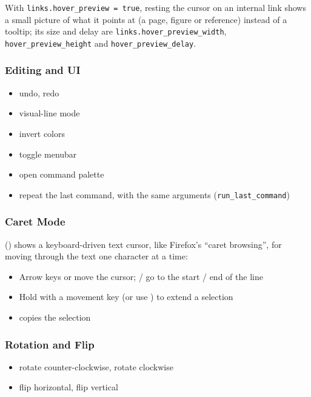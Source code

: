 \documentclass[a4paper,12pt]{article}
\begin{document}
With \texttt{links.hover\_\allowbreak{}preview = true}, resting the cursor on an internal link shows a small picture of what it points at (a page, figure or reference) instead of a tooltip; its size and delay are \texttt{links.hover\_\allowbreak{}preview\_\allowbreak{}width}, \texttt{hover\_\allowbreak{}preview\_\allowbreak{}height} and \texttt{hover\_\allowbreak{}preview\_\allowbreak{}delay}.

\subsubsection{Editing and UI}
\begin{itemize}[leftmargin=*]
    \item {} undo, \quad {} redo
    \item {} visual-line mode
    \item {} invert colors
    \item {} toggle menubar
    \item \keys{:} open command palette
    \item {} repeat the last command, with the same arguments (\texttt{run\_\allowbreak{}last\_\allowbreak{}command})
\end{itemize}

\subsubsection{Caret Mode}

 () shows a keyboard-driven text cursor, like Firefox's ``caret browsing'', for moving through the text one character at a time:
\begin{itemize}[leftmargin=*]
    \item Arrow keys or     move the cursor;  /  go to the start / end of the line
    \item Hold  with a movement key (or use    ) to extend a selection
    \item {} copies the selection
\end{itemize}

\subsubsection{Rotation and Flip}
\begin{itemize}[leftmargin=*]
    \item \keys{<} rotate counter-clockwise, \quad \keys{>} rotate clockwise
    \item \keys{|} flip horizontal, \quad \keys{\_} flip vertical
\end{itemize}
\end{document}
